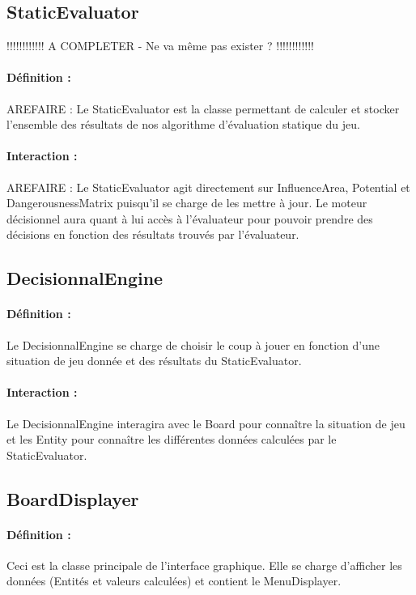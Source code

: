 		\subsection*{StaticEvaluator}

			!!!!!!!!!!!! A COMPLETER - Ne va même pas exister ? !!!!!!!!!!!!
			\paragraph{Définition :}
			AREFAIRE : Le StaticEvaluator est la classe permettant de calculer et stocker l'ensemble des résultats de nos algorithme 
			d'évaluation statique du jeu.
			\paragraph{Interaction :}
			AREFAIRE : Le StaticEvaluator agit directement sur InfluenceArea, Potential et DangerousnessMatrix puisqu'il se charge 
			de les mettre à jour. Le moteur décisionnel aura quant à lui accès à l'évaluateur pour pouvoir prendre des décisions en fonction 
			des résultats trouvés par l'évaluateur.

		\subsection*{DecisionnalEngine}

			\paragraph{Définition :}
			Le DecisionnalEngine se charge de choisir le coup à jouer en fonction d'une situation de jeu donnée et des résultats 
			du StaticEvaluator.
			\paragraph{Interaction :}
			Le DecisionnalEngine interagira avec le Board pour connaître la situation de jeu et les Entity pour connaître les 
			différentes données calculées par le StaticEvaluator.

		\subsection*{BoardDisplayer}

			\paragraph{Définition :}
			Ceci est la classe principale de l'interface graphique. Elle se charge d'afficher les données (Entités et valeurs calculées)
			et contient le MenuDisplayer.
